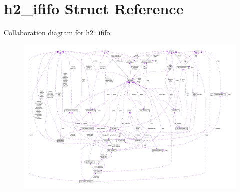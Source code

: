 \hypertarget{structh2__ififo}{}\section{h2\+\_\+ififo Struct Reference}
\label{structh2__ififo}


Collaboration diagram for h2\+\_\+ififo\+:
\nopagebreak
\begin{figure}[H]
\begin{center}
\leavevmode
\includegraphics[width=350pt]{structh2__ififo__coll__graph}
\end{center}
\end{figure}
